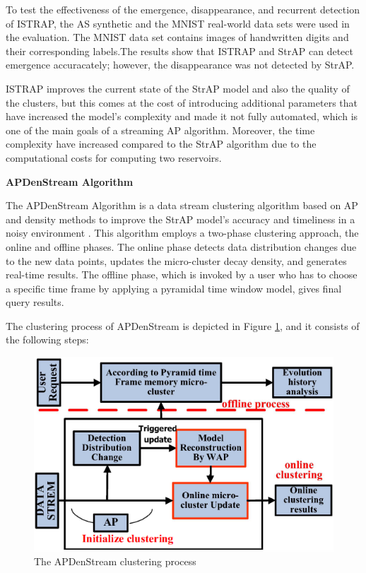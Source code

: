 
To test the effectiveness of the emergence, disappearance, and recurrent detection of ISTRAP, the AS synthetic and the MNIST real-world data sets were used in the evaluation. The MNIST data set contains images of handwritten digits and their corresponding labels.The results show that ISTRAP and StrAP can detect emergence accuracately; however, the disappearance was not detected by StrAP.

ISTRAP improves the current state of the StrAP model and also the quality of the clusters, but this comes at the cost of introducing additional parameters that have increased the model's complexity and made it not fully automated, which is one of the main goals of a streaming AP algorithm. Moreover, the time complexity have increased compared to the StrAP algorithm due to the computational costs for computing two reservoirs. 






\textbf{APDenStream Algorithm}

The APDenStream Algorithm is a data stream clustering algorithm based on AP and density methods to improve the StrAP model's accuracy and timeliness in a noisy environment \cite{zhang2013online}. This algorithm employs a two-phase clustering approach, the online and offline phases. The online phase detects data distribution changes due to the new data points, updates the micro-cluster decay density, and generates real-time results. The offline phase, which is invoked by a user who has to choose a specific time frame by applying a pyramidal time window model, gives final query results. 

The clustering process of APDenStream is depicted in Figure \ref{APden}, and it consists of the following steps: 


\begin{figure}[h]
\centering
\includegraphics[width = 10 cm]{image/Chapters/Chapter3/APDenstream.PNG}
\caption{The APDenStream clustering process}
\label{APden}
\end{figure}



